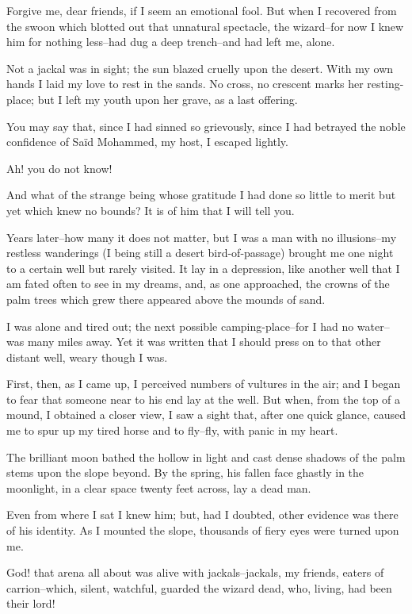 Forgive me, dear friends, if I seem an emotional fool. But when I
recovered from the swoon which blotted out that unnatural spectacle,
the wizard--for now I knew him for nothing less--had dug a deep
trench--and had left me, alone.

Not a jackal was in sight; the sun blazed cruelly upon the desert.
With my own hands I laid my love to rest in the sands. No cross, no
crescent marks her resting-place; but I left my youth upon her grave,
as a last offering.

You may say that, since I had sinned so grievously, since I had
betrayed the noble confidence of Saïd Mohammed, my host, I escaped
lightly.

Ah! you do not know!

And what of the strange being whose gratitude I had done so little to
merit but yet which knew no bounds? It is of him that I will tell you.

Years later--how many it does not matter, but I was a man with no
illusions--my restless wanderings (I being still a desert
bird-of-passage) brought me one night to a certain well but rarely
visited. It lay in a depression, like another well that I am fated
often to see in my dreams, and, as one approached, the crowns of the
palm trees which grew there appeared above the mounds of sand.

I was alone and tired out; the next possible camping-place--for I had
no water--was many miles away. Yet it was written that I should press
on to that other distant well, weary though I was.

First, then, as I came up, I perceived numbers of vultures in the air;
and I began to fear that someone near to his end lay at the well. But
when, from the top of a mound, I obtained a closer view, I saw a sight
that, after one quick glance, caused me to spur up my tired horse and
to fly--fly, with panic in my heart.

The brilliant moon bathed the hollow in light and cast dense shadows
of the palm stems upon the slope beyond. By the spring, his fallen
face ghastly in the moonlight, in a clear space twenty feet across,
lay a dead man.

Even from where I sat I knew him; but, had I doubted, other evidence
was there of his identity. As I mounted the slope, thousands of fiery
eyes were turned upon me.

God! that arena all about was alive with jackals--jackals, my friends,
eaters of carrion--which, silent, watchful, guarded the wizard dead,
who, living, had been their lord!





